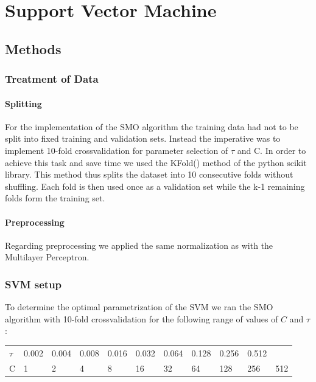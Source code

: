 \section{Support Vector Machine}

\subsection{Methods}
\subsubsection{Treatment of Data}
\paragraph{Splitting}
For the implementation of the SMO algorithm the training data had not to be split into fixed training and validation sets. Instead the imperative was to implement 10-fold crossvalidation for parameter selection of $\tau$ and C. In order to achieve this task and save time we used the KFold() method of the python scikit library. This method thus splits the dataset into 10 consecutive folds without shuffling. Each fold is then used once as a validation set while the k-1 remaining folds form the training set.
\paragraph{Preprocessing}
Regarding preprocessing we applied the same normalization as with the Multilayer Perceptron.

\subsubsection{SVM setup}
To determine the optimal parametrization of the SVM we ran the SMO algorithm with 10-fold crossvalidation for the following range of values of $C$ and $\tau$:
\begin{tabular}{l|llllllllll} 
	\toprule
	$\tau$ & 0.002 & 0.004 & 0.008 & 0.016 & 0.032 & 0.064 & 0.128 & 0.256 & 0.512 \\
	C & 1 & 2 & 4 & 8 & 16 & 32 & 64 & 128 & 256 & 512 \\
	\bottomrule
\end{tabular}

